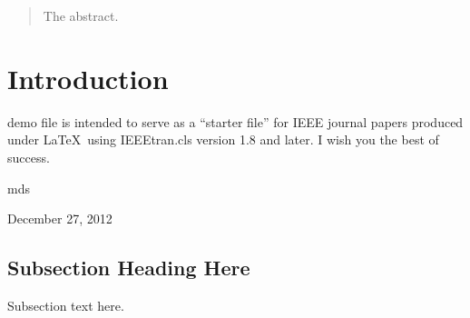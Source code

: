 \documentclass[journal]{IEEEtran}
\begin{document}
\begin{abstract}
The abstract.
\end{abstract}

\begin{IEEEkeywords}

\end{IEEEkeywords}


%
\IEEEpeerreviewmaketitle



\section{Introduction}
% 
% 
% 
% 
 demo file is intended to serve as a ``starter file''
for IEEE journal papers produced under \LaTeX\ using
IEEEtran.cls version 1.8 and later.
I wish you the best of success.

\hfill mds
 
\hfill December 27, 2012

\subsection{Subsection Heading Here}
Subsection text here.

\end{document}
